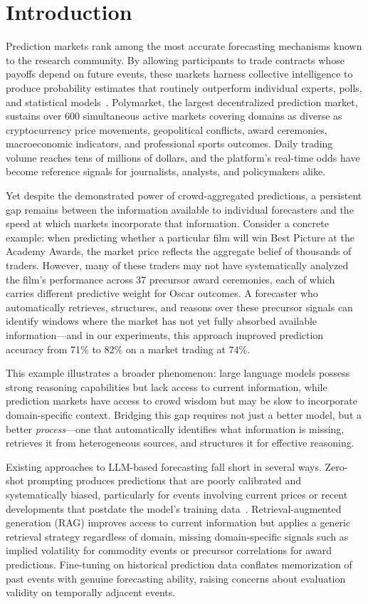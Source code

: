 \section{Introduction}
\label{sec:intro}

Prediction markets rank among the most accurate forecasting mechanisms known to the research community. By allowing participants to trade contracts whose payoffs depend on future events, these markets harness collective intelligence to produce probability estimates that routinely outperform individual experts, polls, and statistical models~\cite{arrow2008promise,wolfers2004prediction}. Polymarket, the largest decentralized prediction market, sustains over 600 simultaneous active markets covering domains as diverse as cryptocurrency price movements, geopolitical conflicts, award ceremonies, macroeconomic indicators, and professional sports outcomes. Daily trading volume reaches tens of millions of dollars, and the platform's real-time odds have become reference signals for journalists, analysts, and policymakers alike.

Yet despite the demonstrated power of crowd-aggregated predictions, a persistent gap remains between the information available to individual forecasters and the speed at which markets incorporate that information. Consider a concrete example: when predicting whether a particular film will win Best Picture at the Academy Awards, the market price reflects the aggregate belief of thousands of traders. However, many of these traders may not have systematically analyzed the film's performance across 37 precursor award ceremonies, each of which carries different predictive weight for Oscar outcomes. A forecaster who automatically retrieves, structures, and reasons over these precursor signals can identify windows where the market has not yet fully absorbed available information---and in our experiments, this approach improved prediction accuracy from 71\% to 82\% on a market trading at 74\%.

This example illustrates a broader phenomenon: large language models possess strong reasoning capabilities but lack access to current information, while prediction markets have access to crowd wisdom but may be slow to incorporate domain-specific context. Bridging this gap requires not just a better model, but a better \emph{process}---one that automatically identifies what information is missing, retrieves it from heterogeneous sources, and structures it for effective reasoning.

Existing approaches to LLM-based forecasting fall short in several ways. Zero-shot prompting produces predictions that are poorly calibrated and systematically biased, particularly for events involving current prices or recent developments that postdate the model's training data~\cite{halawi2024approaching}. Retrieval-augmented generation (RAG) improves access to current information but applies a generic retrieval strategy regardless of domain, missing domain-specific signals such as implied volatility for commodity events or precursor correlations for award predictions. Fine-tuning on historical prediction data conflates memorization of past events with genuine forecasting ability, raising concerns about evaluation validity on temporally adjacent events.

